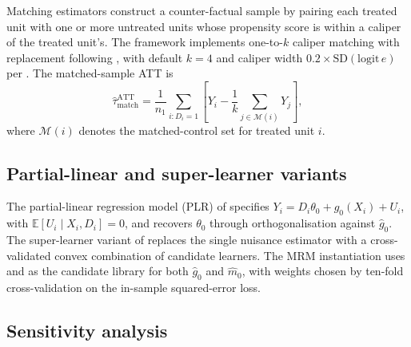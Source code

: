 \documentclass[article,shortnames,nojss]{jss}
\renewcommand{\E}{\mathbb{E}}
\begin{document}
Matching estimators construct a counter-factual sample by pairing
each treated unit with one or more untreated units whose propensity
score is within a caliper of the treated unit's. The framework
implements one-to-$k$ caliper matching with replacement following
\citet{Stuart2010}, with default $k=4$ and caliper width $0.2 \times
\mathrm{SD}(\mathrm{logit}\,e)$ per \citet{Austin2011}. The
matched-sample ATT is
\begin{equation}
\hat{\tau}^{\mathrm{ATT}}_{\mathrm{match}} =
\frac{1}{n_1} \sum_{i : D_i = 1} \left[ Y_i - \frac{1}{k} \sum_{j \in \mathcal{M}(i)} Y_j \right],
\end{equation}
where $\mathcal{M}(i)$ denotes the matched-control set for treated
unit $i$.

\subsection{Partial-linear and super-learner variants}

The partial-linear regression model (PLR) of
\citet{Chernozhukov2018DML} specifies $Y_i = D_i \theta_0 +
g_0(X_i) + U_i$, with $\E[U_i \mid X_i, D_i] = 0$, and recovers
$\theta_0$ through orthogonalisation against $\hat{g}_0$. The
super-learner variant of \citet{vanderLaan2007SL} replaces the
single nuisance estimator with a cross-validated convex combination
of candidate learners. The MRM instantiation uses 
\citep{Friedman2010glmnet} and 
\citep{Wright2017ranger} as the candidate library for both
$\hat{g}_0$ and $\hat{m}_0$, with weights chosen by ten-fold
cross-validation on the in-sample squared-error loss.

\subsection{Sensitivity analysis}
\end{document}
